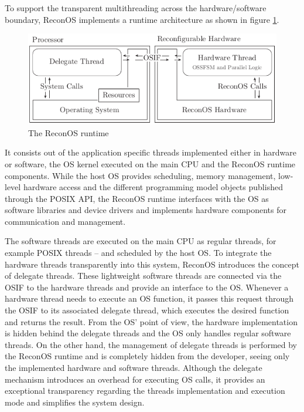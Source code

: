To support the transparent multithreading across the hardware/software
boundary, ReconOS implements a runtime architecture as shown in figure
\ref{fig:reconos_runtime}.
\begin{figure}[tb]
	\centering
	\includegraphics{../figures/reconos_hwt}
	\caption{The ReconOS runtime}
	\label{fig:reconos_runtime}
\end{figure}
It consists out of the application specific threads implemented either in
hardware or software, the \ac{OS} kernel executed on the main \ac{CPU} and the
ReconOS runtime components. While the host \ac{OS} provides scheduling, memory
management, low-level hardware access and the different programming model
objects published through the \ac{POSIX} API, the ReconOS runtime interfaces
with the \ac{OS} as software libraries and device drivers and implements
hardware components for communication and management.

The software threads are executed on the main \ac{CPU} as regular threads, for
example \ac{POSIX} threads -- and scheduled by the host \ac{OS}. To integrate
the hardware threads transparently into this system, ReconOS introduces the
concept of delegate threads. These lightweight software threads are connected
via the \ac{OSIF} to the hardware threads and provide an interface to the
\ac{OS}. Whenever a hardware thread needs to execute an \ac{OS} function, it
passes this request through the \ac{OSIF} to its associated delegate thread,
which executes the desired function and returns the result. From the \ac{OS}'
point of view, the hardware implementation is hidden behind the delegate
threads and the \ac{OS} only handles regular software threads. On the other
hand, the management of delegate threads is performed by the ReconOS runtime
and is completely hidden from the developer, seeing only the implemented
hardware and software threads. Although the delegate mechanism introduces an
overhead for executing \ac{OS} calls, it provides an exceptional transparency
regarding the threads implementation and execution mode and simplifies the
system design.

